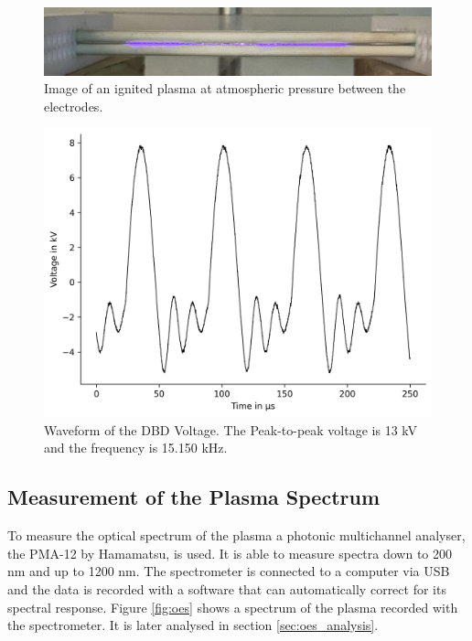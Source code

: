 \begin{figure}
    \centering
    \includegraphics[width=1\textwidth]{images/Plasma.png}
    \caption[Image of the APP]{Image of an ignited plasma at atmospheric pressure between the electrodes.}
    \label{fig:plasma}
\end{figure}

\begin{figure}
    \centering
    \includegraphics[width=.8\textwidth]{images/Waveform.png}
    \caption[Waveform of the DBD Voltage]{Waveform of the DBD Voltage. The Peak-to-peak voltage is 13 kV and the frequency is 15.150 kHz.}
    \label{fig:signal}
\end{figure}


\subsection{Measurement of the Plasma Spectrum}
\label{sec:oes}
To measure the optical spectrum of the plasma a photonic multichannel analyser, the \textsc{PMA-12} by Hamamatsu, is used. It is able to measure spectra down to 200 nm and up to 1200 nm. The spectrometer is connected to a computer via USB and the data is recorded with a software that can automatically correct for its spectral response. Figure \ref{fig:oes} shows a spectrum of the plasma recorded with the spectrometer. It is later analysed in section \ref{sec:oes_analysis}.  

